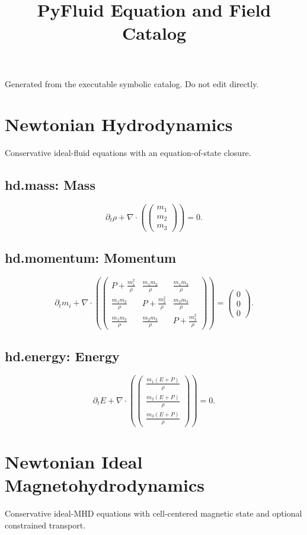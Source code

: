 \documentclass[11pt]{article}
\title{PyFluid Equation and Field Catalog}
\date{}
\begin{document}
\maketitle
Generated from the executable symbolic catalog. Do not edit directly.
\section{Newtonian Hydrodynamics}
Conservative ideal-fluid equations with an equation-of-state closure.
\subsection*{hd.mass: Mass}
\[
\partial_t \rho + \nabla\cdot\left(\begin{pmatrix}m_{1} \\ m_{2} \\ m_{3}\end{pmatrix}\right) = 0.
\]
\subsection*{hd.momentum: Momentum}
\[
\partial_t m_i + \nabla\cdot\left(\begin{pmatrix}P + \frac{m_{1}^{2}}{\rho} & \frac{m_{1} m_{2}}{\rho} & \frac{m_{1} m_{3}}{\rho} \\ \frac{m_{1} m_{2}}{\rho} & P + \frac{m_{2}^{2}}{\rho} & \frac{m_{2} m_{3}}{\rho} \\ \frac{m_{1} m_{3}}{\rho} & \frac{m_{2} m_{3}}{\rho} & P + \frac{m_{3}^{2}}{\rho}\end{pmatrix}\right) = \begin{pmatrix}0 \\ 0 \\ 0\end{pmatrix}.
\]
\subsection*{hd.energy: Energy}
\[
\partial_t E + \nabla\cdot\left(\begin{pmatrix}\frac{m_{1} \left(E + P\right)}{\rho} \\ \frac{m_{2} \left(E + P\right)}{\rho} \\ \frac{m_{3} \left(E + P\right)}{\rho}\end{pmatrix}\right) = 0.
\]
\section{Newtonian Ideal Magnetohydrodynamics}
Conservative ideal-MHD equations with cell-centered magnetic state and optional constrained transport.
\end{document}
